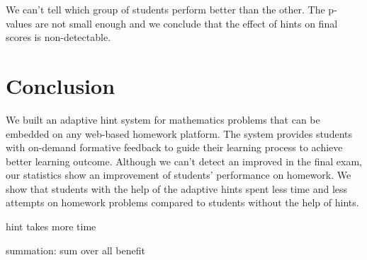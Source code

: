 \documentclass{sigchi}
\begin{document}
We can't tell which group of students perform better than the other. The p-values are not small enough and we conclude that the effect of hints on final scores is non-detectable.


\section{Conclusion}
We built an adaptive hint system for mathematics problems that can be embedded on any web-based homework platform. The system provides students with on-demand formative feedback to guide their learning process to achieve better learning outcome. Although we can't detect an improved in the final exam, our statistics show an improvement of students' performance on homework. We show that students with the help of the adaptive hints spent less time and less attempts on homework problems compared to students without the help of hints.

hint takes more time

summation: sum over all benefit 

\balance{}

%


\end{document}
